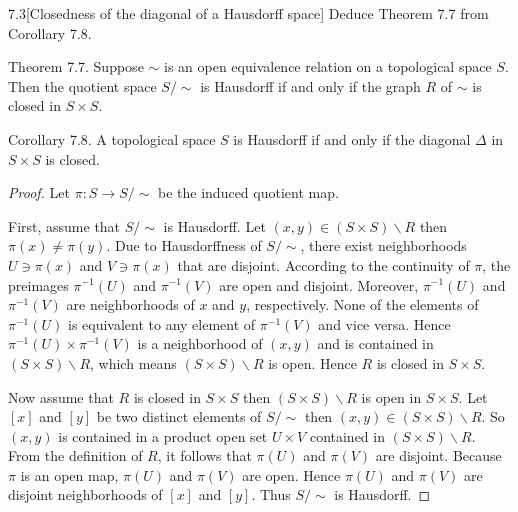 \begin{problem}{7.3}[Closedness of the diagonal of a Hausdorff space]
Deduce Theorem 7.7 from Corollary 7.8.

Theorem 7.7. Suppose \( \sim \) is an open equivalence relation on a topological space \( S \). Then the quotient space \( S/\!\sim \) is Hausdorff if and only if the graph \( R \) of \( \sim \) is closed in \( S\times S \).

Corollary 7.8. A topological space \( S \) is Hausdorff if and only if the diagonal \( \Delta \) in \( S\times S \) is closed.
\end{problem}

\begin{proof}
    Let \( \pi: S \to S/\!\sim \) be the induced quotient map.

    First, assume that \( S/\!\sim \) is Hausdorff. Let \( (x, y) \in (S\times S)\smallsetminus R \) then \( \pi(x) \ne \pi(y) \). Due to Hausdorffness of \( S/\!\sim \), there exist neighborhoods \( U \ni \pi(x) \) and \( V \ni \pi(x) \) that are disjoint. According to the continuity of \( \pi \), the preimages \( \pi^{-1}(U) \) and \( \pi^{-1}(V) \) are open and disjoint. Moreover, \( \pi^{-1}(U) \) and \( \pi^{-1}(V) \) are neighborhoods of \( x \) and \( y \), respectively. None of the elements of \( \pi^{-1}(U) \) is equivalent to any element of \( \pi^{-1}(V) \) and vice versa. Hence \( \pi^{-1}(U) \times \pi^{-1}(V) \) is a neighborhood of \( (x, y) \) and is contained in \( (S \times S)\smallsetminus R \), which means \( (S\times S)\smallsetminus R \) is open. Hence \( R \) is closed in \( S\times S \).

    Now assume that \( R \) is closed in \( S\times S \) then \( (S\times S)\smallsetminus R \) is open in \( S\times S \). Let \( [x] \) and \( [y] \) be two distinct elements of \( S/\!\sim \) then \( (x, y) \in (S\times S)\smallsetminus R \). So \( (x, y) \) is contained in a product open set \( U\times V \) contained in \( (S\times S)\smallsetminus R \). From the definition of \( R \), it follows that \( \pi(U) \) and \( \pi(V) \) are disjoint. Because \( \pi \) is an open map, \( \pi(U) \) and \( \pi(V) \) are open. Hence \( \pi(U) \) and \( \pi(V) \) are disjoint neighborhoods of \( [x] \) and \( [y] \). Thus \( S/\!\sim \) is Hausdorff.
\end{proof}

